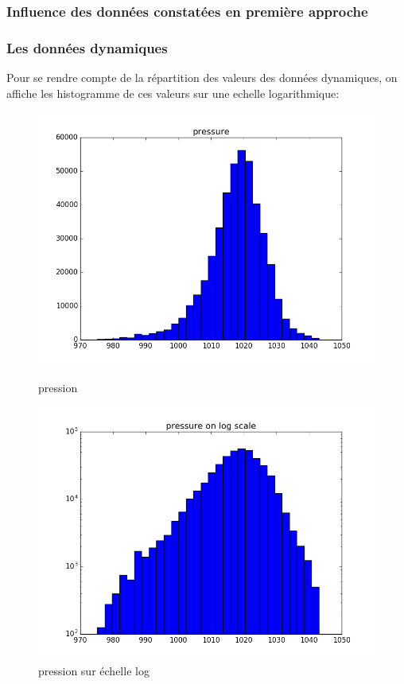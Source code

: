 \subsubsection{Influence des données constatées en première approche}

\subsubsection{Les données dynamiques}

Pour se rendre compte de la répartition des valeurs des données dynamiques, on affiche les histogramme de ces valeurs sur une echelle logarithmique:

\begin{figure}[H]
	\captionsetup{labelformat=empty}
	\includegraphics[width=\linewidth]{images/pression.png}
	\caption{pression}
	\endminipage\hfill
	\includegraphics[width=\linewidth]{images/log_pression.png}
	\caption{pression sur échelle log}
	\endminipage\hfill
\end{figure}



